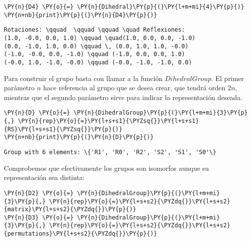 \begin{itemize}
\begin{enumerate}
    \begin{tcolorbox}[breakable, size=fbox, boxrule=1pt, pad at break*=1mm,colback=cellbackground, colframe=cellborder]
\begin{Verbatim}[commandchars=\\\{\}]
\PY{n}{D4} \PY{o}{=} \PY{n}{Dihedral}\PY{p}{(}\PY{l+m+mi}{4}\PY{p}{)}
\PY{n+nb}{print}\PY{p}{(}\PY{n}{D4}\PY{p}{)}
\end{Verbatim}
\end{tcolorbox}

    \begin{Verbatim}[commandchars=\\\{\}]
Rotaciones: \qquad  \qquad \qquad \quad Reflexiones:
(1.0, -0.0, 0.0, 1.0) \qquad \quad(1.0, 0.0, 0.0, -1.0)
(0.0, -1.0, 1.0, 0.0) \qquad \, (0.0, 1.0, 1.0, -0.0)
(-1.0, -0.0, 0.0, -1.0) \qquad (-1.0, 0.0, 0.0, 1.0)
(-0.0, 1.0, -1.0, -0.0) \qquad (-0.0, -1.0, -1.0, 0.0)
    \end{Verbatim}

    Para construir el grupo basta con llamar a la función $DihedralGroup$.
El primer parámetro $n$ hace referencia al grupo que se desea crear,
que tendrá orden $2n$, mientras que el segundo parámetro sirve para
indicar la representación deseada.

    \begin{tcolorbox}[breakable, size=fbox, boxrule=1pt, pad at break*=1mm,colback=cellbackground, colframe=cellborder]
\begin{Verbatim}[commandchars=\\\{\}]
\PY{n}{D} \PY{o}{=} \PY{n}{DihedralGroup}\PY{p}{(}\PY{l+m+mi}{3}\PY{p}{,} \PY{n}{rep}\PY{o}{=}\PY{l+s+s1}{\PYZsq{}}\PY{l+s+s1}{RS}\PY{l+s+s1}{\PYZsq{}}\PY{p}{)}
\PY{n+nb}{print}\PY{p}{(}\PY{n}{D}\PY{p}{)}
\end{Verbatim}
\end{tcolorbox}

    \begin{Verbatim}[commandchars=\\\{\}]
Group with 6 elements: \{'R1', 'R0', 'R2', 'S2', 'S1', 'S0'\}
    \end{Verbatim}

Comprobemos que efectivamente los grupos son isomorfos aunque su representación sea distinta:
    \begin{tcolorbox}[breakable, size=fbox, boxrule=1pt, pad at break*=1mm,colback=cellbackground, colframe=cellborder]
\begin{Verbatim}[commandchars=\\\{\}]
\PY{n}{D2} \PY{o}{=} \PY{n}{DihedralGroup}\PY{p}{(}\PY{l+m+mi}{3}\PY{p}{,} \PY{n}{rep}\PY{o}{=}\PY{l+s+s2}{\PYZdq{}}\PY{l+s+s2}{matrix}\PY{l+s+s2}{\PYZdq{}}\PY{p}{)}
\PY{n}{D3} \PY{o}{=} \PY{n}{DihedralGroup}\PY{p}{(}\PY{l+m+mi}{3}\PY{p}{,} \PY{n}{rep}\PY{o}{=}\PY{l+s+s2}{\PYZdq{}}\PY{l+s+s2}{permutations}\PY{l+s+s2}{\PYZdq{}}\PY{p}{)}
\end{Verbatim}
\end{tcolorbox}


\end{enumerate}
\end{itemize}
